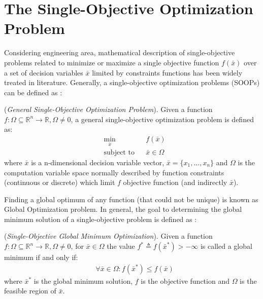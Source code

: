 \section{The Single-Objective Optimization Problem}
Considering engineering area, mathematical description of single-objective problems related to minimize or maximize a single objective function $f(\bar x)$ over a set of decision variables $\bar x$ limited by constraints functions has been widely treated in literature. Generally, a single-objective optimization problems (SOOPs) can be defined as \cite{bib1Chiandussi}:
\theoremstyle{definition}
\begin{definition}{(\textit{General Single-Objective Optimization Problem}).} Given a function $ f : \Omega \subseteq \mathbb{R}^{n} \to \mathbb{R}, \Omega \not= 0$, a general single-objective optimization problem is defined as: 
%
\begin{equation} \label{equation111}
  \begin{aligned}
    & \underset{\bar x}{\text{min}} &  & f(\bar x) \\
    & \text{subject to}             &  & \bar x \in \Omega
\end{aligned}
\end{equation}
%
where $\bar x$ is a n-dimensional decision variable vector, $\bar x = \{x_1,\ldots, x_n\}$ and $\Omega$ is the computation variable space normally described by function constraints (continuous or discrete) which limit $f$ objective function (and indirectly $\bar x$).
\end{definition}
%
Finding a global optimum of any function (that could not be unique) is known as Global Optimization problem. In general, the goal to determining the global minimum solution of a single-objective problem is defined as \cite{bib2}:
%
\theoremstyle{definition}
\begin{definition}{(\textit{Single-Objective Global Minimum Optimization}).}\label{def1}
Given a function $ f : \Omega \subseteq \mathbb{R}^{n} \to \mathbb{R}, \Omega \not= 0$, for $\bar x \in \Omega$ the value $f^\ast \triangleq f(\bar x^\ast) > -\infty$ is called a global minimum if and only if: 
%
\begin{equation}\label{equation112}
  \begin{aligned}
    & \forall \bar x \in \Omega : f(\bar x^\ast) \leq f(\bar x)
\end{aligned}
\end{equation}
where $\bar x^\ast$ is the global minimum solution, $f$ is the objective function and $\Omega$ is the feasible region of $\bar x$.
\end{definition}
%
